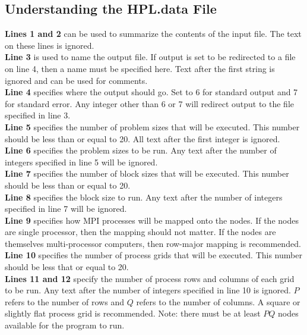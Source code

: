 \documentclass[a4paper, 11pt]{article}
\begin{document}
\subsection{Understanding the HPL.data File}
	
	\noindent\textbf{\large Lines 1 and 2} can be used to summarize the contents of the input file. The text on these lines is ignored. \\
		
	\noindent\textbf{\large Line 3} is used to name the output file. If output is set to be redirected to a file on line 4, then a name must be specified here. Text after the first string is ignored and can be used for comments. \\
	
	\noindent\textbf{\large Line 4} specifies where the output should go. Set to 6 for standard output and 7 for standard error. Any integer other than 6 or 7 will redirect output to the file specified in line 3. \\
	
	\noindent\textbf{\large Line 5} specifies the number of problem sizes that will be executed. This number should be less than or equal to 20. All text after the first integer is ignored. \\
	
	\noindent\textbf{\large Line 6} specifies the problem sizes to be run. Any text after the number of integers specified in line 5 will be ignored. \\
	
	\noindent\textbf{\large Line 7} specifies the number of block sizes that will be executed. This number should be less than or equal to 20. \\
	
	\noindent\textbf{\large Line 8} specifies the block size to run. Any text after the number of integers specified in line 7 will be ignored. \\
	
	\noindent\textbf{\large Line 9} specifies how MPI processes will be mapped onto the nodes. If the nodes are single processor, then the mapping should not matter. If the nodes are themselves multi-processor computers, then row-major mapping is recommended. \\
	
	\noindent\textbf{\large Line 10} specifies the number of process grids that will be executed. This number should be less that or equal to 20. \\
	
	\noindent\textbf{\large Lines 11 and 12} specify the number of process rows and columns of each grid to be run. Any text after the number of integers specified in line 10 is ignored. $P$ refers to the number of rows and $Q$ refers to the number of columns. A square or slightly flat process grid is recommended. Note: there must be at least $PQ$ nodes available for the program to run. \\
	
\end{document}
